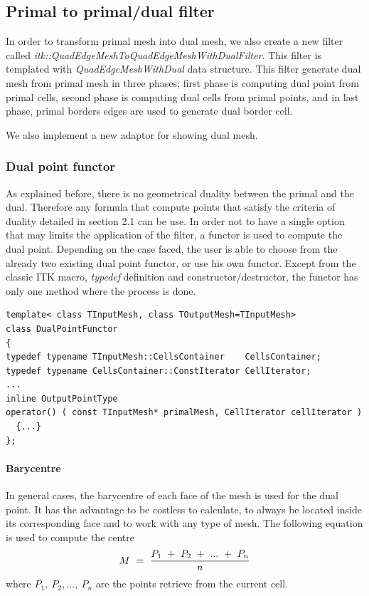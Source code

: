 \documentclass{InsightArticle}
\begin{document}
\subsection{Primal to primal/dual filter }
In order to transform primal mesh into dual mesh, we also create a new filter called \emph{itk::QuadEdgeMeshToQuadEdgeMeshWithDualFilter}. This filter is templated with \emph{QuadEdgeMeshWithDual} data structure. This filter generate dual mesh from primal mesh in three phases; first phase is computing dual point from primal cells, second phase is computing dual cells from primal points, and in last phase, primal borders edges are used to generate dual border cell.

We also implement a new adaptor for showing dual mesh.
\subsubsection{Dual point functor}
As explained before, there is no geometrical duality between the primal and the dual. Therefore any formula that compute points that satisfy the criteria of duality detailed in section 2.1 can be use. In order not to have a single option that may limits the application of the filter, a functor is used to compute the dual point. Depending on the case faced, the user is able to choose from the already two existing dual point functor, or use his own functor. Except from the classic ITK macro, \emph{typedef} definition and constructor/destructor, the functor has only one method where the process is done.
\begin{verbatim}
template< class TInputMesh, class TOutputMesh=TInputMesh>
class DualPointFunctor
{
typedef typename TInputMesh::CellsContainer    CellsContainer;
typedef typename CellsContainer::ConstIterator CellIterator;
...
inline OutputPointType 
operator() ( const TInputMesh* primalMesh, CellIterator cellIterator ) 
  {...}
};
\end{verbatim}
\paragraph{\textbf{Barycentre}}
In general cases, the barycentre of each face of the mesh is used for the dual point. It has the advantage to be costless to calculate, to always be located inside its corresponding face and to work with any type of mesh. The following equation is used to compute the centre
\begin{equation}
\label{eq5}
M~=~\frac{P_1~+~P_2~+~\mathnormal{...}~+~P_n}{n}
\end{equation}
where $P_1,~P_2, ...,~P_n$ are the points retrieve from the current cell.
\end{document}
